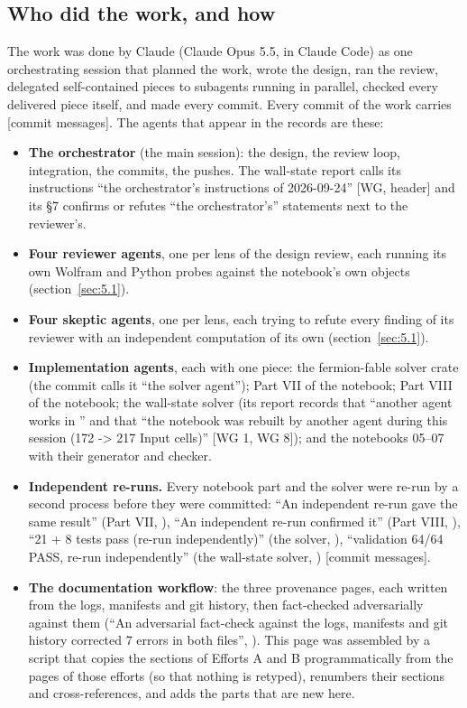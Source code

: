 \subsection{Who did the work, and how}
\label{sec:0.3}

The work was done by Claude (Claude Opus 5.5, in Claude Code) as one orchestrating session that planned the work, wrote the design, ran the review, delegated self-contained pieces to subagents running in parallel, checked every delivered piece itself, and made every commit. Every commit of the work carries  [commit messages]. The agents that appear in the records are these:

\begin{itemize}
  \item \textbf{The orchestrator} (the main session): the design, the review loop, integration, the commits, the pushes. The wall-state report calls its instructions ``the orchestrator's instructions of 2026-09-24'' [WG, header] and its \S{}7 confirms or refutes ``the orchestrator's'' statements next to the reviewer's.
  \item \textbf{Four reviewer agents}, one per lens of the design review, each running its own Wolfram and Python probes against the notebook's own objects (section~\ref{sec:5.1}).
  \item \textbf{Four skeptic agents}, one per lens, each trying to refute every finding of its reviewer with an independent computation of its own (section~\ref{sec:5.1}).
  \item \textbf{Implementation agents}, each with one piece: the fermion-fable solver crate (the commit  calls it ``the solver agent''); Part VII of the notebook; Part VIII of the notebook; the wall-state solver (its report records that ``another agent works in '' and that ``the notebook was rebuilt by another agent during this session (172 -> 217 Input cells)'' [WG 1, WG 8]); and the notebooks 05--07 with their generator and checker.
  \item \textbf{Independent re-runs.} Every notebook part and the solver were re-run by a second process before they were committed: ``An independent re-run gave the same result'' (Part VII, ), ``An independent re-run confirmed it'' (Part VIII, ), ``21 + 8 tests pass (re-run independently)'' (the solver, ), ``validation 64/64 PASS, re-run independently'' (the wall-state solver, ) [commit messages].
  \item \textbf{The documentation workflow}: the three provenance pages, each written from the logs, manifests and git history, then fact-checked adversarially against them (``An adversarial fact-check against the logs, manifests and git history corrected 7 errors in both files'', ). This page was assembled by a script that copies the sections of Efforts A and B programmatically from the pages of those efforts (so that nothing is retyped), renumbers their sections and cross-references, and adds the parts that are new here.
\end{itemize}


